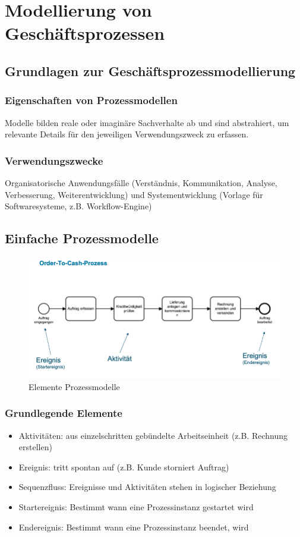\section{Modellierung von Geschäftsprozessen}

\subsection{Grundlagen zur Geschäftsprozessmodellierung}
    \subsubsection*{Eigenschaften von Prozessmodellen}
        Modelle bilden reale oder imaginäre Sachverhalte ab und sind abstrahiert, um relevante Details für den jeweiligen Verwendungszweck zu erfassen.
    \subsubsection*{Verwendungszwecke}
        Organisatorische Anwendungsfälle (Verständnis, Kommunikation, Analyse, Verbesserung, Weiterentwicklung) und Systementwicklung (Vorlage für Softwaresysteme, z.B. Workflow-Engine)

\subsection{Einfache Prozessmodelle}
    \begin{figure}[h]
        \centering
        \includegraphics[width=\textwidth]{image/Elemente-Prozessmodelle.png}
        \caption{Elemente Prozessmodelle}
        \label{fig:Elemente-Prozessmodelle}
    \end{figure}
    \subsubsection*{Grundlegende Elemente}
        \begin{itemize}
            \item Aktivitäten: aus einzelschritten gebündelte Arbeitseinheit (z.B. Rechnung erstellen)
            \item Ereignis: tritt spontan auf (z.B. Kunde storniert Auftrag)
            \item Sequenzfluss: Ereignisse und Aktivitäten stehen in logischer Beziehung
            \item Startereignis: Bestimmt wann eine Prozessinstanz gestartet wird
            \item Endereignis: Bestimmt wann eine Prozessinstanz beendet, wird
        \end{itemize}
